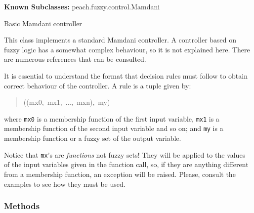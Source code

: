 \textbf{Known Subclasses:} peach.fuzzy.control.Mamdani


Basic Mamdani controller

This class implements a standard Mamdani controller. A controller based on
fuzzy logic has a somewhat complex behaviour, so it is not explained here.
There are numerous references that can be consulted.

It is essential to understand the format that decision rules must follow to
obtain correct behaviour of the controller. A rule is a tuple given by:
\begin{quote}{\ttfamily \raggedright \noindent
((mx0,~mx1,~...,~mxn),~my)
}\end{quote}

where \texttt{mx0} is a membership function of the first input variable, \texttt{mx1}
is a membership function of the second input variable and so on; and \texttt{my}
is a membership function or a fuzzy set of the output variable.

Notice that \texttt{mx}'s are \emph{functions} not fuzzy sets! They will be applied to
the values of the input variables given in the function call, so, if they
are anything different from a membership function, an exception will be
raised. Please, consult the examples to see how they must be used.


  \subsubsection{Methods}

    \vspace{0.5ex}

